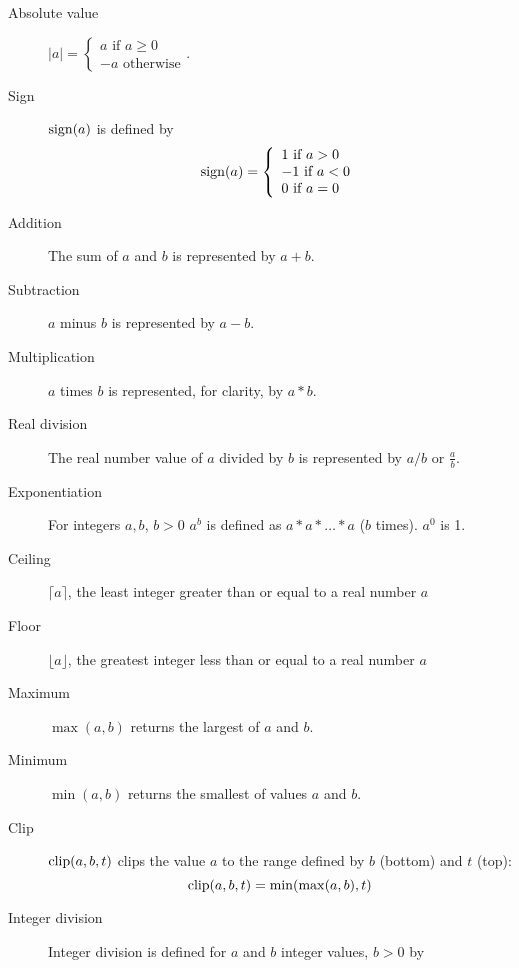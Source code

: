 \begin{description}
\item[Absolute value] $|a|=\left\lbrace\begin{array}{l} a \text{ if $a\geq 0$}\\ 
                                                                                   -a \text{ otherwise} \end{array}\right.$.

\item[Sign] $\operatorname{sign}(a)$ is defined by
\[\operatorname{sign}(a)=
\left\{\begin{array}{l} 
1 \text{ if $a>0$} \\
-1 \text{ if $a<0$} \\
0 \text{ if $a=0$}
\end{array}\right.\]

\item[Addition] The sum of $a$ and $b$ is represented by $a+b$.

\item[Subtraction] $a$ minus $b$ is represented by $a-b$.

\item[Multiplication] $a$ times $b$ is represented, for clarity, by $a*b$.

\item[Real division] The real number value of $a$ divided by $b$ is represented by $a/b$ or $\frac{a}{b}$.

\item[Exponentiation] For integers $a, b$, $b>0$ $a^b$ is defined as $a*a*\hdots *a$ ($b$ times). $a^0$ is 1.

\item[Ceiling] $\lceil a \rceil$, the least integer greater than or equal to a real number $a$

\item[Floor] $\lfloor a \rfloor$, the greatest integer less than or equal to a real number $a$

\item[Maximum] $\max(a,b)$ returns the largest of $a$ and $b$.

\item[Minimum] $\min(a,b)$ returns the smallest of values $a$ and $b$.

\item[Clip] $\operatorname{clip}(a,b,t)$ clips the value $a$ to the range defined by $b$ (bottom)
and $t$ (top):
\[\operatorname{clip}(a,b,t)=\min(\max(a,b),t)\]

\item[Integer division] Integer division is defined for $a$ and $b$ integer values, $b>0$ by


\end{description}
